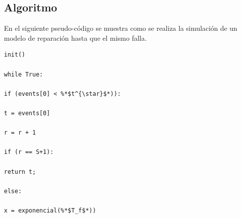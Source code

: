 \documentclass[10pt,a4paper]{article} %
\begin{document}
                                                                                                                                            \subsection{Algoritmo}
                                                                                                                                                En el siguiente pseudo-c\'odigo se muestra como se realiza la simulaci\'on de un modelo de reparaci\'on hasta que el mismo falla.
                                                                                                                                                    
                                                                                                                                                        \begin{lstlisting}[caption=Funciones auxiliares.]
                                                                                                                                                        init()
                                                                                                                                                        while True:
                                                                                                                                                                if (events[0] < %*$t^{\star}$*)):
                                                                                                                                                                            t = events[0]
                                                                                                                                                                                    r = r + 1
                                                                                                                                                                                            if (r == S+1):
                                                                                                                                                                                                            return t;
                                                                                                                                                                                                                    else:
                                                                                                                                                                                                                                    x = exponencial(%*$T_f$*))

\end{lstlisting}
\end{document}
